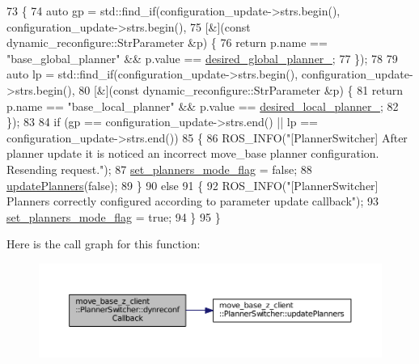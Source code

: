 \begin{DoxyCode}
73 \{
74   \textcolor{keyword}{auto} gp = std::find\_if(configuration\_update->strs.begin(), configuration\_update->strs.begin(),
75                          [&](\textcolor{keyword}{const} dynamic\_reconfigure::StrParameter &p) \{
76                            \textcolor{keywordflow}{return} p.name == \textcolor{stringliteral}{"base\_global\_planner"} && p.value == 
      \hyperlink{classmove__base__z__client_1_1PlannerSwitcher_a004c15858f0a6b9abcd8211d58a7e34c}{desired\_global\_planner\_};
77                          \});
78 
79   \textcolor{keyword}{auto} lp = std::find\_if(configuration\_update->strs.begin(), configuration\_update->strs.begin(),
80                          [&](\textcolor{keyword}{const} dynamic\_reconfigure::StrParameter &p) \{
81                            \textcolor{keywordflow}{return} p.name == \textcolor{stringliteral}{"base\_local\_planner"} && p.value == 
      \hyperlink{classmove__base__z__client_1_1PlannerSwitcher_ae47bd6c9c70b27cddcb394f26bb9372d}{desired\_local\_planner\_};
82                          \});
83 
84   \textcolor{keywordflow}{if} (gp == configuration\_update->strs.end() || lp == configuration\_update->strs.end())
85   \{
86     ROS\_INFO(\textcolor{stringliteral}{"[PlannerSwitcher] After planner update it is noticed an incorrect move\_base planner
       configuration. Resending request."});
87     \hyperlink{classmove__base__z__client_1_1PlannerSwitcher_a74c0b5c21064a868700288e759446ac5}{set\_planners\_mode\_flag} = \textcolor{keyword}{false};
88     \hyperlink{classmove__base__z__client_1_1PlannerSwitcher_a189ac8c027169a111c7d8e14d864752f}{updatePlanners}(\textcolor{keyword}{false});
89   \}
90   \textcolor{keywordflow}{else}
91   \{
92     ROS\_INFO(\textcolor{stringliteral}{"[PlannerSwitcher] Planners correctly configured according to parameter update callback"});
93     \hyperlink{classmove__base__z__client_1_1PlannerSwitcher_a74c0b5c21064a868700288e759446ac5}{set\_planners\_mode\_flag} = \textcolor{keyword}{true};
94   \}
95 \}
\end{DoxyCode}


Here is the call graph for this function\+:
\nopagebreak
\begin{figure}[H]
\begin{center}
\leavevmode
\includegraphics[width=350pt]{classmove__base__z__client_1_1PlannerSwitcher_a7eacfedc6b6ea404ee8fab062d62a911_cgraph}
\end{center}
\end{figure}




